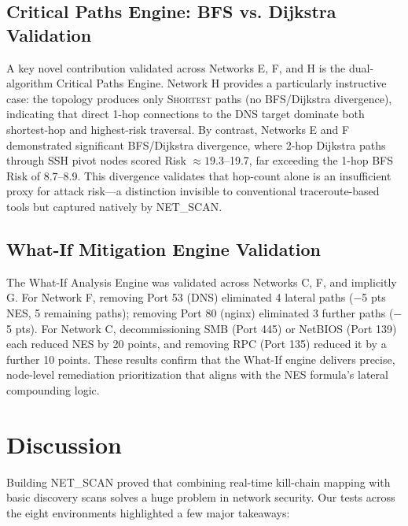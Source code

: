 \documentclass[conference]{IEEEtran}
\begin{document}
\subsection{Critical Paths Engine: BFS vs. Dijkstra Validation}
A key novel contribution validated across Networks E, F, and H is the dual-algorithm Critical Paths Engine. Network H provides a particularly instructive case: the topology produces only \textsc{Shortest} paths (no BFS/Dijkstra divergence), indicating that direct 1-hop connections to the DNS target dominate both shortest-hop and highest-risk traversal. By contrast, Networks E and F demonstrated significant BFS/Dijkstra divergence, where 2-hop Dijkstra paths through SSH pivot nodes scored Risk $\approx 19.3$--19.7, far exceeding the 1-hop BFS Risk of 8.7--8.9. This divergence validates that hop-count alone is an insufficient proxy for attack risk---a distinction invisible to conventional traceroute-based tools but captured natively by NET\_SCAN.

\subsection{What-If Mitigation Engine Validation}
The What-If Analysis Engine was validated across Networks C, F, and implicitly G. For Network F, removing Port 53 (DNS) eliminated 4 lateral paths ($-$5 pts NES, 5 remaining paths); removing Port 80 (nginx) eliminated 3 further paths ($-$5 pts). For Network C, decommissioning SMB (Port 445) or NetBIOS (Port 139) each reduced NES by 20 points, and removing RPC (Port 135) reduced it by a further 10 points. These results confirm that the What-If engine delivers precise, node-level remediation prioritization that aligns with the NES formula's lateral compounding logic.

\section{Discussion}
Building NET\_SCAN proved that combining real-time kill-chain mapping with basic discovery scans solves a huge problem in network security. Our tests across the eight environments highlighted a few major takeaways:
\end{document}
